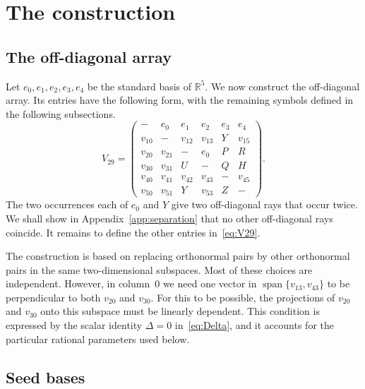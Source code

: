 \documentclass[11pt]{article}
\theoremstyle{definition}
\newcommand{\R}{\mathbb R}
\newcommand{\spn}{\operatorname{span}}
\begin{document}
\section{The construction}\label{sec:construction}

\subsection{The off-diagonal array}

Let $e_0,e_1,e_2,e_3,e_4$ be the standard basis of $\R^5$.  We now construct
the off-diagonal array.  Its entries have the following form, with the
remaining symbols defined in the following subsections.
\begin{equation}\label{eq:V29}
V_{29}=
\begin{pmatrix}
- & e_0 & e_1 & e_2 & e_3 & e_4\\
v_{10} & - & v_{12} & v_{13} & Y & v_{15}\\
v_{20} & v_{21} & - & e_0 & P & R\\
v_{30} & v_{31} & U & - & Q & H\\
v_{40} & v_{41} & v_{42} & v_{43} & - & v_{45}\\
v_{50} & v_{51} & Y & v_{53} & Z & -
\end{pmatrix}.
\end{equation}
The two occurrences each of $e_0$ and $Y$ give two off-diagonal rays that
occur twice.  We shall show in Appendix~\ref{app:separation} that no other
off-diagonal rays coincide.  It remains to define the other entries
in~\eqref{eq:V29}.

The construction is based on replacing orthonormal pairs by other orthonormal
pairs in the same two-dimensional subspaces.  Most of these choices are
independent.  However, in column~$0$ we need one vector in
$\spn\{v_{13},v_{43}\}$ to be perpendicular to both $v_{20}$ and $v_{30}$.
For this to be possible, the projections of $v_{20}$ and $v_{30}$ onto this
subspace must be linearly dependent.  This condition is expressed by the
scalar identity $\Delta=0$ in~\eqref{eq:Delta}, and it accounts for the
particular rational parameters used below.

\subsection{Seed bases}
\end{document}
